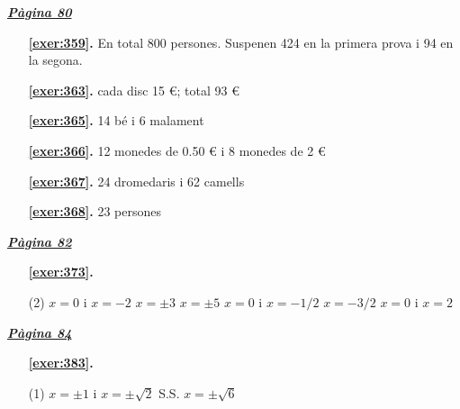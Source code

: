 
\hyperlink{page.80}{\textbf{\em Pàgina 80}}
\begin{enumerate}
\item[\fontfamily{phv}\selectfont\color{blue}\textbf{\ref{exer:359}. }] \label{ans:359} 
En total 800 persones. Suspenen 424 en la primera prova i 94 en la segona.
 \end{enumerate}
\begin{enumerate}
\item[\fontfamily{phv}\selectfont\color{blue}\textbf{\ref{exer:363}. }] \label{ans:363} 
cada disc 15 \euro {}; total 93 \euro {}
\item[\fontfamily{phv}\selectfont\color{blue}\textbf{\ref{exer:365}. }] \label{ans:365} 
14 bé i 6 malament
\item[\fontfamily{phv}\selectfont\color{blue}\textbf{\ref{exer:366}. }] \label{ans:366} 
12 monedes de 0.50 \euro {} i 8 monedes de 2 \euro {}
\item[\fontfamily{phv}\selectfont\color{blue}\textbf{\ref{exer:367}. }] \label{ans:367} 
24 dromedaris i 62 camells
\item[\fontfamily{phv}\selectfont\color{blue}\textbf{\ref{exer:368}. }] \label{ans:368} 
23 persones
 \end{enumerate}
\vspace{0.3cm}


\hyperlink{page.82}{\textbf{\em Pàgina 82}}
\begin{enumerate}



 \item[\fontfamily{phv}\selectfont\color{blue}\textbf{\ref{exer:373}. }] \label{ans:373}
 \begin{tasks}[column-sep=1em, item-indent=1.3333em](2)
	 \task $x=0$ i $x=-2$
	 \task $x=\pm 3$
	 \task $x=\pm 5$
	 \task $x=0$ i $x=-1/2$
	 \task $x=-3/2$
	 \task $x=0$ i $x=2$
\end{tasks}
 \end{enumerate}
\vspace{0.3cm}


\hyperlink{page.84}{\textbf{\em Pàgina 84}}
\begin{enumerate}



 \item[\fontfamily{phv}\selectfont\color{blue}\textbf{\ref{exer:383}. }] \label{ans:383}
 \begin{tasks}[column-sep=1em, item-indent=1.3333em](1)
	 \task $x=\pm 1$ i $x=\pm \sqrt {2}$
	 \task S.S.
	 \task $x=\pm \sqrt {6}$
\end{tasks}
 \end{enumerate}
\vspace{0.3cm}

